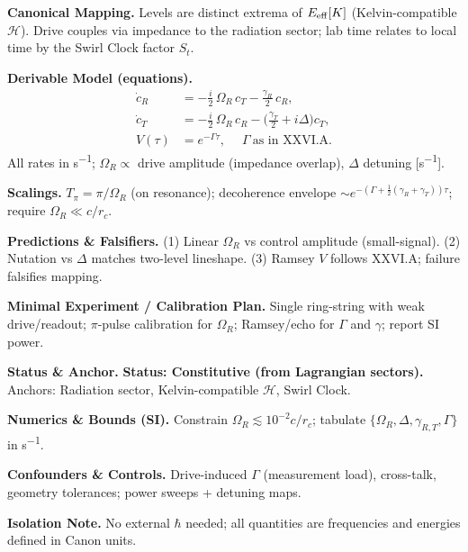 \documentclass[10pt,reprint,aps,onecolumn,nofootinbib]{revtex4-2}
\begin{document}
        \textbf{Canonical Mapping.}
        Levels are distinct extrema of $E_{\rm eff}[K]$ (Kelvin-compatible $\mathcal H$). Drive couples via impedance to the radiation sector; lab time relates to local time by the Swirl Clock factor $S_t$.

        \textbf{Derivable Model (equations).}
        \[
            \begin{aligned}
                \dot c_R &= -\tfrac{i}{2}\,\Omega_R\, c_T - \tfrac{\gamma_R}{2}\,c_R,\\
                \dot c_T &= -\tfrac{i}{2}\,\Omega_R\, c_R - \Big(\tfrac{\gamma_T}{2}+ i\Delta\Big) c_T,\\
                V(\tau) &= e^{-\Gamma \tau},\quad \; \Gamma\ \text{as in XXVI.A}.
            \end{aligned}
        \]
        All rates in \si{s^{-1}}; $\Omega_R\!\propto$ drive amplitude (impedance overlap), $\Delta$ detuning [\si{s^{-1}}].

        \textbf{Scalings.}
        $T_\pi=\pi/\Omega_R$ (on resonance); decoherence envelope $\sim e^{-(\Gamma+\tfrac{1}{2}(\gamma_R+\gamma_T))\tau}$; require $\Omega_R \ll c/r_c$.

        \textbf{Predictions \& Falsifiers.}
        (1) Linear $\Omega_R$ vs control amplitude (small-signal). (2) Nutation vs $\Delta$ matches two-level lineshape. (3) Ramsey $V$ follows XXVI.A; failure falsifies mapping.

        \textbf{Minimal Experiment / Calibration Plan.}
        Single ring-string with weak drive/readout; $\pi$-pulse calibration for $\Omega_R$; Ramsey/echo for $\Gamma$ and $\gamma$; report SI power.

        \textbf{Status \& Anchor.}
        \textbf{Status: Constitutive (from Lagrangian sectors).} Anchors: Radiation sector, Kelvin-compatible $\mathcal H$, Swirl Clock.

        \textbf{Numerics \& Bounds (SI).}
        Constrain $\Omega_R \lesssim 10^{-2} c/r_c$; tabulate $\{\Omega_R,\Delta,\gamma_{R,T},\Gamma\}$ in \si{s^{-1}}.

        \textbf{Confounders \& Controls.}
        Drive-induced $\Gamma$ (measurement load), cross-talk, geometry tolerances; power sweeps + detuning maps.

        \textbf{Isolation Note.}
        No external $\hbar$ needed; all quantities are frequencies and energies defined in Canon units.

\end{document}
